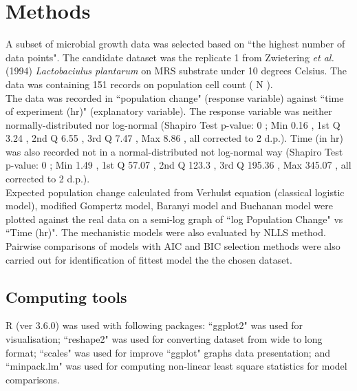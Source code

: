 \documentclass[a4paper, 11pt]{article}
\begin{document}
	\section*{Methods}
	A subset of microbial growth data was selected based on ``the highest number of data points".  The candidate dataset was the replicate %
1
	 from Zwietering \textit{et al.}(1994)\autocite{zwietering1994modeling} \textit{%
Lactobaciulus plantarum
	}on %
MRS
	 substrate under %
10
	 degrees Celsius.  The data was containing %
151
	 records on population cell count (%
N
).\\
	The data was recorded in ``population change" (response variable) against ``time of experiment (hr)" (explanatory variable).  The response variable was neither normally-distributed nor log-normal (Shapiro Test p-value: %
0
	; Min
0.16
	, 1st Q
3.24
	, 2nd Q
6.55
	, 3rd Q
7.47
	, Max
8.86
	, all corrected to 2 d.p.).  Time (in hr) was also recorded not in a normal-distributed not log-normal way (Shapiro Test p-value: %
0
	; Min
1.49
	, 1st Q
57.07
	, 2nd Q
123.3
	, 3rd Q
195.36
	, Max
345.07
	, all corrected to 2 d.p.).\\
	Expected population change calculated from Verhulst equation (classical logistic model)\autocite{mckendrick1912xlv}, modified Gompertz model\autocite{GIL200689}, Baranyi model\autocite{baranyi1993modeling} and Buchanan model\autocite{buchanan1993differentiation} were plotted against the real data on a semi-log graph of ``log Population Change" vs ``Time (hr)".  The mechanistic models were also evaluated by NLLS method\autocite{kelley1999iterative,strutz2010data}.  Pairwise comparisons of models with AIC\autocite{akaike1998information,burnhamdr} and BIC\autocite{schwarz1978estimating} selection methods were also carried out for identification of fittest model the the chosen dataset.
	\subsection*{Computing tools}
	R (ver 3.6.0)\autocite{Rcore} was used with following packages: ``ggplot2"\autocite{ggplot2} was used for visualisation; ``reshape2"\autocite{reshape2} was used for converting dataset from wide to long format; ``scales"\autocite{scales} was used for improve ``ggplot" graphs data presentation; and ``minpack.lm"\autocite{minpacklm} was used for computing non-linear least square statistics for model comparisons.
	
\end{document}
